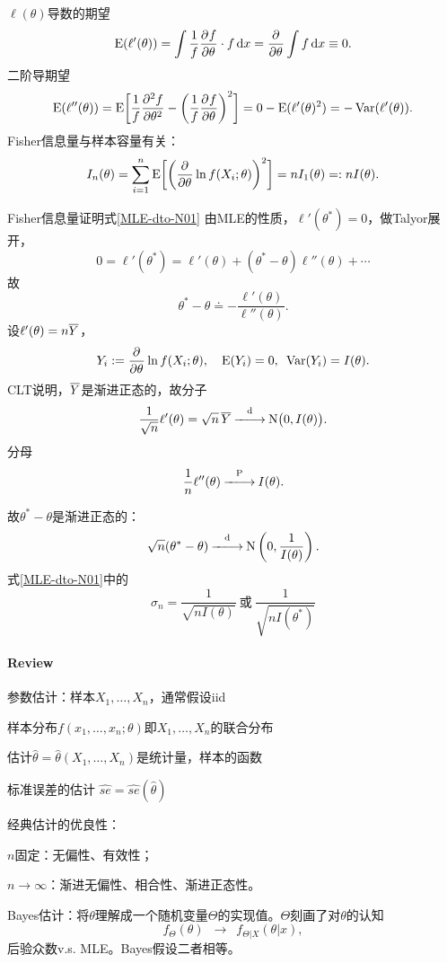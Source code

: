 $\ell(\theta)$导数的期望
\[
	\E(\ell'(\theta))=\int\frac1f\pv f\theta\cdot f\d x=\pp\theta\int f\d x\equiv 0.
\]
二阶导期望
\[
	\E(\ell''(\theta))=\E\biggl[\frac1f\pv[2]f\theta-\biggl(\frac1f\pv f\theta\biggr)^2\biggr]=0-\E(\ell'(\theta)^2)=-\Var(\ell'(\theta)).
\]
Fisher信息量与样本容量有关：
\[
	I_n(\theta)=\sum_{i=1}^n\E\biggl[\biggl(\pp\theta\ln f(X_i;\theta)\biggr)^2\biggr]=nI_1(\theta)=:nI(\theta).
\]
\begin{example}{Fisher信息量证明式\eqref{MLE-dto-N01}}{}
	由MLE的性质，$\ell'(\theta^\ast)=0$，做Talyor展开，
	\[
		0=\ell'(\theta^\ast)=\ell'(\theta)+(\theta^\ast-\theta)\ell''(\theta)+\cdots
	\]
	故
	\[
		\theta^\ast-\theta\doteq-\frac{\ell'(\theta)}{\ell''(\theta)}.
	\]
	设$\ell'(\theta)=n\avg Y$，
	\[
		Y_i:=\pp\theta\ln f(X_i;\theta),\quad\E(Y_i)=0,\enspace\Var(Y_i)=I(\theta).
	\]
	CLT说明，$\avg Y$是渐进正态的，故分子
	\[
		\frac1{\sqrt n}\ell'(\theta)=\sqrt n\,\avg Y\dto\Norm\bigkh{0,I(\theta)}.
	\]
	分母
	\[
		\frac1n\ell''(\theta)\pto I(\theta).
	\]

	故$\theta^\ast-\theta$是渐进正态的：
	\[
		\sqrt n(\theta^\ast-\theta)\dto\Norm\kh{0,\frac1{I(\theta)}}.
	\]
	式\eqref{MLE-dto-N01}中的 
	\[
		\sigma_n=\frac1{\sqrt{nI(\theta)}}~\text{或}~\frac1{\sqrt{nI(\theta^\ast)}}
	\]
\end{example}
\paragraph{Review}
\begin{compactenum}
	\item 参数估计：样本$X_1,\ldots,X_n$，通常假设iid
	
	样本分布$f(x_1,\ldots,x_n;\theta)$即$X_1,\ldots,X_n$的联合分布

	估计$\hat\theta=\hat\theta(X_1,\ldots,X_n)$是统计量，样本的函数

	标准误差的估计
	$\hat{se}=\hat{se}(\hat\theta)$
	\item 经典估计的优良性：
	
	$n$固定：无偏性、有效性；

	$n\to\infty$：渐进无偏性、相合性、渐进正态性。

	\item Bayes估计：将$\theta$理解成一个随机变量$\varTheta$的实现值。$\varTheta$刻画了对$\theta$的认知
	\[
		f_\varTheta(\theta)\enspace\to\enspace f_{\varTheta|X}(\theta|x),
	\]
	后验众数v.s. MLE。Bayes假设二者相等。
\end{compactenum}
